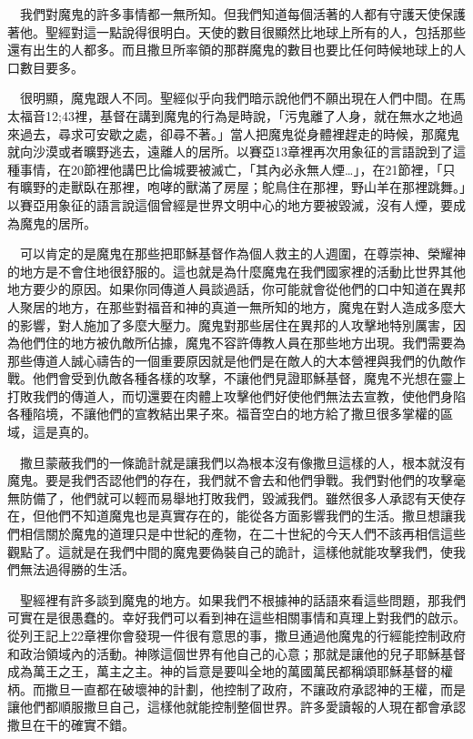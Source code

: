\documentclass{book}
\begin{document}
　我們對魔鬼的許多事情都一無所知。但我們知道每個活著的人都有守護天使保護著他。聖經對這一點說得很明白。天使的數目很顯然比地球上所有的人，包括那些還有出生的人都多。而且撒旦所率領的那群魔鬼的數目也要比任何時候地球上的人口數目要多。

　很明顯，魔鬼跟人不同。聖經似乎向我們暗示說他們不願出現在人們中間。在馬太福音12;43裡，基督在講到魔鬼的行為是時說，「污鬼離了人身，就在無水之地過來過去，尋求可安歇之處，卻尋不著。」當人把魔鬼從身體裡趕走的時候，那魔鬼就向沙漠或者曠野逃去，遠離人的居所。以賽亞13章裡再次用象征的言語說到了這種事情，在20節裡他講巴比倫城要被滅亡，「其內必永無人煙…」，在21節裡，「只有曠野的走獸臥在那裡，咆哮的獸滿了房屋；鴕鳥住在那裡，野山羊在那裡跳舞。」以賽亞用象征的語言說這個曾經是世界文明中心的地方要被毀滅，沒有人煙，要成為魔鬼的居所。

　可以肯定的是魔鬼在那些把耶穌基督作為個人救主的人週圍，在尊崇神、榮耀神的地方是不會住地很舒服的。這也就是為什麼魔鬼在我們國家裡的活動比世界其他地方要少的原因。如果你同傳道人員談過話，你可能就會從他們的口中知道在異邦人聚居的地方，在那些對福音和神的真道一無所知的地方，魔鬼在對人造成多麼大的影響，對人施加了多麼大壓力。魔鬼對那些居住在異邦的人攻擊地特別厲害，因為他們住的地方被仇敵所佔據，魔鬼不容許傳教人員在那些地方出現。我們需要為那些傳道人誠心禱告的一個重要原因就是他們是在敵人的大本營裡與我們的仇敵作戰。他們會受到仇敵各種各樣的攻擊，不讓他們見證耶穌基督，魔鬼不光想在靈上打敗我們的傳道人，而切還要在肉體上攻擊他們好使他們無法去宣教，使他們身陷各種陷境，不讓他們的宣教結出果子來。福音空白的地方給了撒旦很多掌權的區域，這是真的。

　撒旦蒙蔽我們的一條詭計就是讓我們以為根本沒有像撒旦這樣的人，根本就沒有魔鬼。要是我們否認他們的存在，我們就不會去和他們爭戰。我們對他們的攻擊毫無防備了，他們就可以輕而易舉地打敗我們，毀滅我們。雖然很多人承認有天使存在，但他們不知道魔鬼也是真實存在的，能從各方面影響我們的生活。撒旦想讓我們相信關於魔鬼的道理只是中世紀的產物，在二十世紀的今天人們不該再相信這些觀點了。這就是在我們中間的魔鬼要偽裝自己的詭計，這樣他就能攻擊我們，使我們無法過得勝的生活。

　聖經裡有許多談到魔鬼的地方。如果我們不根據神的話語來看這些問題，那我們可實在是很愚蠢的。幸好我們可以看到神在這些相關事情和真理上對我們的啟示。從列王記上22章裡你會發現一件很有意思的事，撒旦通過他魔鬼的行經能控制政府和政治領域內的活動。神隊這個世界有他自己的心意；那就是讓他的兒子耶穌基督成為萬王之王，萬主之主。神的旨意是要叫全地的萬國萬民都稱頌耶穌基督的權柄。而撒旦一直都在破壞神的計劃，他控制了政府，不讓政府承認神的王權，而是讓他們都順服撒旦自己，這樣他就能控制整個世界。許多愛讀報的人現在都會承認撒旦在干的確實不錯。
\end{document}
